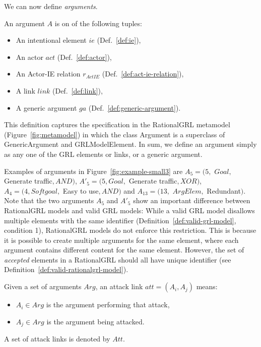 We can now define \emph{arguments}. 

\begin{definition}[Argument]
\label{def:argument}
An argument $A$ is on of the following tuples:
\begin{itemize}
\item An intentional element $ie$ (Def.~\ref{def:ie}), 
\item An actor $act$ (Def.~\ref{def:actor}),
\item An Actor-IE relation $r_{ActIE}$ (Def.~\ref{def:act-ie-relation}), 
\item A link $link$ (Def.~\ref{def:link}),
\item A generic argument $ga$ (Def.~\ref{def:generic-argument}).
\end{itemize}
\end{definition}

This definition captures the specification in the RationalGRL metamodel (Figure~\ref{fig:metamodel}) in which the class \textsf{Argument} is a superclass of \textsf{GenericArgument} and \textsf{GRLModelElement}. In sum, we define an argument simply as any one of the GRL elements or links, or a generic argument. 

Examples of arguments in Figure~\ref{fig:example-small3} are $A_5 = (5,$ $Goal,$ Generate traffic$, AND)$, $A'_5 = (5, Goal,$ Generate traffic$, XOR)$, $A_4 = (4, Softgoal,$ Easy to use$, AND)$ and $A_{13}=(13,$ $ArgElem,$ Redundant$)$. Note that the two arguments $A_5$ and $A'_5$ show an important difference between RationalGRL models and valid GRL models: While a valid GRL model disallows multiple elements with the same identifier (Definition~\ref{def:valid-grl-model}, condition 1), RationalGRL models do not enforce this restriction. This is because it is possible to create multiple arguments for the same element, where each argument contains different content for the same element. However, the set of \emph{accepted} elements in a RationalGRL should all have unique identifier (see Definition~\ref{def:valid-rationalgrl-model}).

\begin{definition}
\label{def:link:attack}
Given a set of arguments $Arg$, an attack link $att=(A_i,A_j)$ means:
\begin{itemize}
\item $A_i\in Arg$ is the argument performing that attack,
\item $A_j\in Arg$ is the argument being attacked.
\end{itemize}
A set of attack links is denoted by $Att$.
\end{definition}

